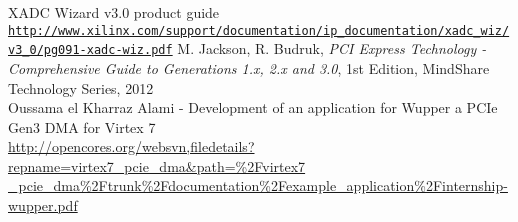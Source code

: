 \begin{thebibliography}{9}
  XADC Wizard v3.0 product guide\\
  \href{http://www.xilinx.com/support/documentation/ip_documentation/xadc_wiz/v3_0/pg091-xadc-wiz.pdf}{\nolinkurl{http://www.xilinx.com/support/documentation/ip\_documentation/xadc\_wiz/v3\_0/pg091-xadc-wiz.pdf}}
 M. Jackson, R. Budruk, \textit{PCI Express Technology - Comprehensive Guide to Generations 1.x, 2.x and 3.0}, 1st Edition, MindShare Technology Series, 2012\\
  Oussama el Kharraz Alami - Development of an application for Wupper a PCIe Gen3 DMA for Virtex 7\\
  \href{http://opencores.org/websvn,filedetails?repname=virtex7\_pcie\_dma\&path=\%2Fvirtex7_pcie_dma\%2Ftrunk\%2Fdocumentation\%2Fexample\_application\%2Finternship-wupper.pdf}{http://opencores.org/websvn,filedetails?repname=virtex7\_pcie\_dma\&path=\%2Fvirtex7 \_pcie\_dma\%2Ftrunk\%2Fdocumentation\%2Fexample\_application\%2Finternship-wupper.pdf}
\end{thebibliography}
\newpage
{}
\listoffigures
{}
\listoftables
\newpage
